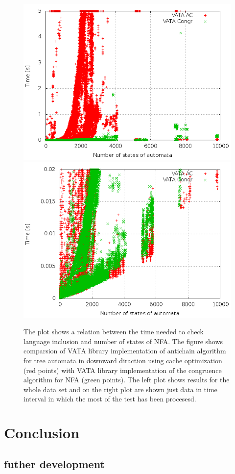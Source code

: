 \begin{figure}
\begin{center}
\includegraphics[scale=0.3]{fig/plot_ca_zprava.png}
\includegraphics[scale=0.3]{fig/plot_ca_step_zprava.png}
\label{figPlotCa}
\caption{The plot shows a relation between the time needed to check language inclusion and number of states of NFA. The figure shows
 comparsion of VATA library implementation of antichain algorithm for tree automata in downward diraction using cache optimization (red points) 
   with VATA library implementation of the congruence algorithm for NFA (green points). 
   The left plot shows results for the whole data set and on the right plot are shown just data in time interval in which the most 
   of the test has been procesesd.}
\end{center}
\end{figure}

\chapter{Conclusion}
\label{concl}
\section{futher development}
